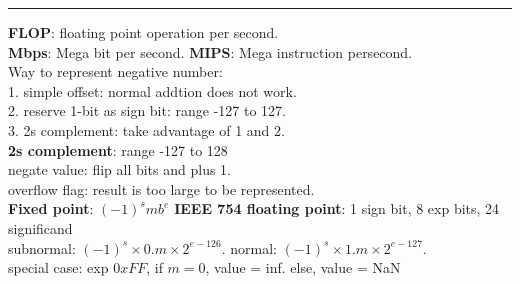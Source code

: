 \documentclass[8pt,a4paper,landscape]{article}
\begin{document}
\begin{spacing}{-1}
\begin{multicols*}{3}
    \hrule \noindent
    \textbf{FLOP}: floating point operation per second. \\
    \textbf{Mbps}: Mega bit per second. \textbf{MIPS}: Mega instruction persecond. \\
    Way to represent negative number: \\
    1. simple offset: normal addtion does not work. \\ 
    2. reserve 1-bit as sign bit: range -127 to 127. \\
    3. 2s complement: take advantage of 1 and 2.  \\
    \textbf{2s complement}: range -127 to 128 \\
    negate value: flip all bits and plus 1. \\
    overflow flag: result is too large to be represented. \\
    \textbf{Fixed point}: $(-1)^s m b^e$ 
    \textbf{IEEE 754 floating point}:  1 sign bit, 8 exp bits, 24 significand \\
    subnormal: $(-1)^s \times 0.m \times 2^{e-126}$. 
    normal: $(-1)^s \times 1.m \times 2^{e-127}$. \\
    special case: exp $0xFF$, if $m = 0$, value = inf. else, value = NaN \\


\end{multicols*}
\end{spacing}
\end{document}
